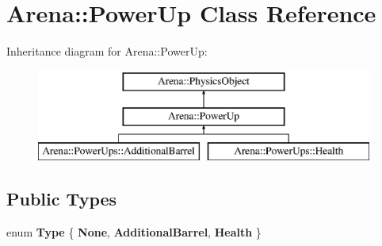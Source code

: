 \hypertarget{class_arena_1_1_power_up}{\section{Arena\+:\+:Power\+Up Class Reference}
\label{class_arena_1_1_power_up}
}
Inheritance diagram for Arena\+:\+:Power\+Up\+:\begin{figure}[H]
\begin{center}
\leavevmode
\includegraphics[height=3.000000cm]{class_arena_1_1_power_up}
\end{center}
\end{figure}
\subsection*{Public Types}
\begin{DoxyCompactItemize}
\item 
\hypertarget{class_arena_1_1_power_up_a2e19993bd559829c59ddaf0a7a6cb659}{enum {\bfseries Type} \{ {\bfseries None}, 
{\bfseries Additional\+Barrel}, 
{\bfseries Health}
 \}}\label{class_arena_1_1_power_up_a2e19993bd559829c59ddaf0a7a6cb659}

\end{DoxyCompactItemize}
